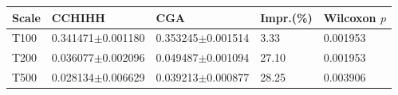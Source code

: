\begin{tabular}{lllll}
\hline
Scale & CCHIHH & CGA & Impr.(\%) & Wilcoxon $p$ \\
\hline
T100 & 0.341471$\pm$0.001180 & 0.353245$\pm$0.001514 & 3.33 & 0.001953 \\
T200 & 0.036077$\pm$0.002096 & 0.049487$\pm$0.001094 & 27.10 & 0.001953 \\
T500 & 0.028134$\pm$0.006629 & 0.039213$\pm$0.000877 & 28.25 & 0.003906 \\
\hline
\end{tabular}